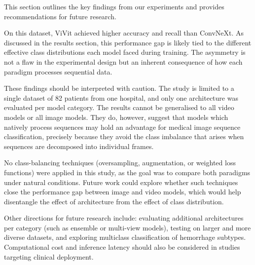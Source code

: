 This section outlines the key findings from our experiments and provides recommendations for future research.

On this dataset, ViVit achieved higher accuracy and recall than ConvNeXt. As discussed in the results section, this performance gap is likely tied to the different effective class distributions each model faced during training. The asymmetry is not a flaw in the experimental design but an inherent consequence of how each paradigm processes sequential data.

These findings should be interpreted with caution. The study is limited to a single dataset of 82 patients from one hospital, and only one architecture was evaluated per model category. The results cannot be generalised to all video models or all image models. They do, however, suggest that models which natively process sequences may hold an advantage for medical image sequence classification, precisely because they avoid the class imbalance that arises when sequences are decomposed into individual frames.

No class-balancing techniques (oversampling, augmentation, or weighted loss functions) were applied in this study, as the goal was to compare both paradigms under natural conditions. Future work could explore whether such techniques close the performance gap between image and video models, which would help disentangle the effect of architecture from the effect of class distribution.

Other directions for future research include: evaluating additional architectures per category (such as ensemble or multi-view models), testing on larger and more diverse datasets, and exploring multiclass classification of hemorrhage subtypes. Computational cost and inference latency should also be considered in studies targeting clinical deployment.
